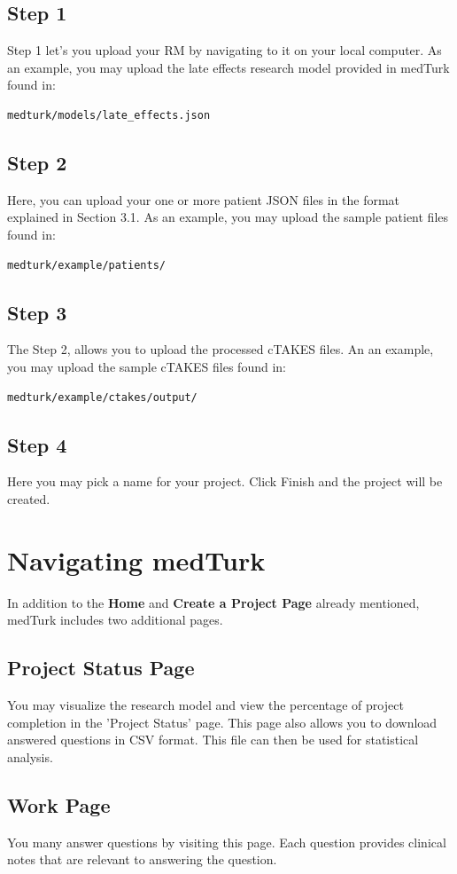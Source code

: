 \documentclass{book}
\begin{document}
\subsection*{Step 1}
Step 1 let's you upload your RM by navigating to it on your local computer. As an example, you may upload the late effects research model provided in medTurk found in:

\begin{verbatim}
medturk/models/late_effects.json
\end{verbatim}


\subsection*{Step 2}
Here, you can upload your one or more patient JSON files in the format explained in Section 3.1. As an example, you may upload the sample patient files found in:
\begin{verbatim}
medturk/example/patients/
\end{verbatim}


\subsection*{Step 3}
The Step 2, allows you to upload the processed cTAKES files. An an example, you may upload the sample cTAKES files found in:
\begin{verbatim}
medturk/example/ctakes/output/
\end{verbatim}

\subsection*{Step 4}
Here you may pick a name for your project. Click Finish and the project will be created.
\\
\section{Navigating medTurk}
In addition to the \textbf{Home} and \textbf{Create a Project Page} already mentioned,  medTurk includes two additional pages.

\subsection*{Project Status Page}
You may visualize the research model and view the percentage of project completion in the 'Project Status' page. This page also allows you to download answered questions in CSV format. This file can then be used for statistical analysis. 


\subsection*{Work Page}
You many answer questions by visiting this page. Each question provides clinical notes that are relevant to answering the question. 
\end{document}
